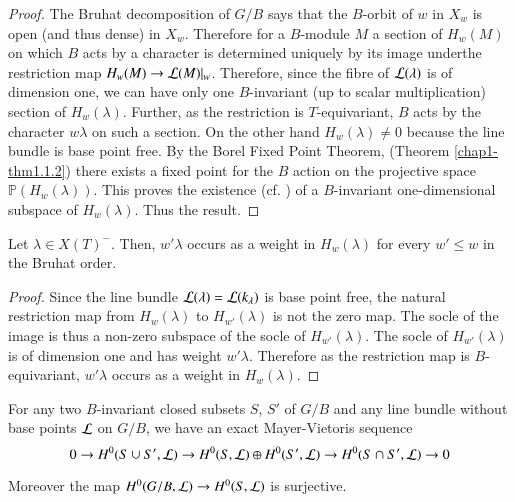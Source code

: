 \begin{proof}
The Bruhat decomposition of $G/B$ says that the $B$-orbit of $w$ in
$X_{w}$ is open (and thus dense) in $X_{w}$. Therefore for a
$B$-module $M$ a section of $H_{w}(M)$ on which $B$ acts by a
character is determined uniquely by its image under\pageoriginale the
restriction map $H_{w}(M)\to \mathcal{L}(M)|_{w}$. Therefore, since the fibre
of $\mathcal{L}(\lambda)$ is of dimension one, we can have only one
$B$-invariant (up to scalar multiplication) section of\label{page16}
$H_{w}(\lambda)$. Further, as the restriction is
$T$-equivariant, $B$
acts by the character $w\lambda$ on such a section. On the other hand
$H_{w}(\lambda)\neq 0$ because the line bundle is base point free. By
the Borel Fixed Point Theorem, (Theorem \ref{chap1-thm1.1.2}) there
exists a fixed point for the $B$ action on the projective space
$\mathbb{P}(H_{w}(\lambda))$. This proves the existence (cf.\@
\cite[II 2.1]{key11}) of a $B$-invariant one-dimensional subspace of
$H_{w}(\lambda)$. Thus the result.
\end{proof}

\begin{corollary}\label{chap2-coro2.2.10}
Let $\lambda\in X(T)^{-}$. Then, $w'\lambda$ occurs as a weight in
$H_{w}(\lambda)$ for every $w'\leq w$ in the Bruhat
order.
\end{corollary}

\begin{proof}
Since the line bundle $\mathcal{L}(\lambda)=\mathcal{L}(k_{\lambda})$ is base point
free, the natural restriction map from $H_{w}(\lambda)$ to
$H_{w'}(\lambda)$ is not the zero map. The socle of the image is thus
a non-zero subspace of the socle of $H_{w'}(\lambda)$. The socle of
$H_{w'}(\lambda)$ is of dimension one and has weight
$w'\lambda$. Therefore as the restriction map is $B$-equivariant,
$w'\lambda$ occurs as a weight in $H_{w}(\lambda)$.
\end{proof}

\begin{lemma}\label{chap2-lem2.2.11}
For any two $B$-invariant closed subsets $S$, $S'$ of $G/B$ and any
line bundle without base points $\mathcal{L}$ on $G/B$, we have an exact
Mayer-Vietoris sequence
$$
0\to H^{0}(S\cup S',\mathcal{L})\to H^{0}(S,\mathcal{L})\oplus H^{0}(S',\mathcal{L})\to
H^{0}(S\cap S',\mathcal{L})\to 0
$$

Moreover the map $H^{0}(G/B,\mathcal{L})\to H^{0}(S,\mathcal{L})$ is surjective.
\end{lemma}

